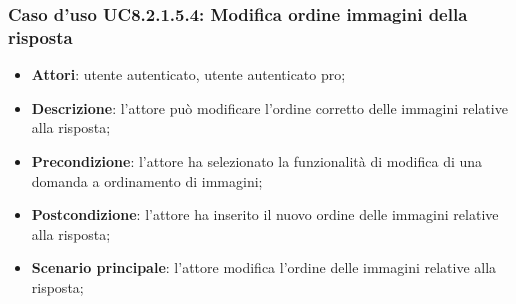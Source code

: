 \subsubsection{Caso d'uso UC8.2.1.5.4: Modifica ordine immagini della risposta}
\begin{itemize}
	\item\textbf{Attori}: utente autenticato, utente autenticato pro;
	\item\textbf{Descrizione}: l'attore può modificare l'ordine corretto delle immagini relative alla risposta;
	\item\textbf{Precondizione}: l'attore ha selezionato la funzionalità di modifica di una domanda a ordinamento di immagini;
	\item \textbf{Postcondizione}: l'attore ha inserito il nuovo ordine delle immagini relative alla risposta;
	\item\textbf{Scenario principale}: l'attore modifica l'ordine delle immagini relative alla risposta;
\end{itemize}